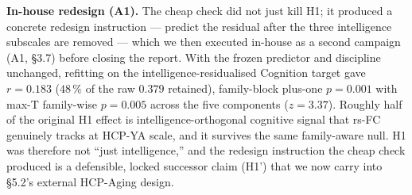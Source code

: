 \documentclass[11pt,letterpaper]{report}
\begin{document}
\textbf{In-house redesign (A1).} The cheap check did not just kill H1; it produced a concrete redesign instruction --- predict the residual after the three intelligence subscales are removed --- which we then executed in-house as a second campaign (A1, \S3.7) before closing the report. With the frozen predictor and discipline unchanged, refitting on the intelligence-residualised Cognition target gave $r = 0.183$ ($48\,\%$ of the raw $0.379$ retained), family-block plus-one $p = 0.001$ with max-T family-wise $p = 0.005$ across the five components ($z = 3.37$). Roughly half of the original H1 effect is intelligence-orthogonal cognitive signal that rs-FC genuinely tracks at HCP-YA scale, and it survives the same family-aware null. H1 was therefore not ``just intelligence,'' and the redesign instruction the cheap check produced is a defensible, locked successor claim (H1') that we now carry into \S5.2's external HCP-Aging design.
\end{document}
